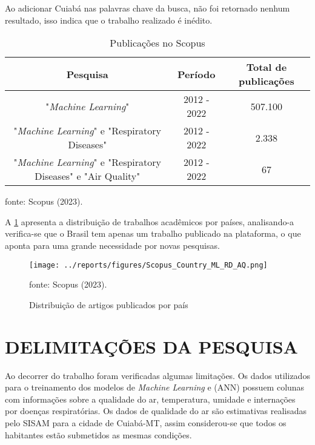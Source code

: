 \documentclass[
  12pt,		%
  a4paper,	%
  openright,%
  oneside,	%
  chapter=TITLE,		%
  section=TITLE,		%
  english,	%
  french,	%
  spanish,	%
  brazil	%
]{abntex2}
\begin{document}
    Ao adicionar Cuiabá nas palavras chave da busca, não foi retornado nenhum resultado, isso indica que o trabalho realizado é inédito.

    \begin{table}[ht]
        \centering
        \caption{Publicações no Scopus}
        \label{tabela scopus}
        \begin{tabular}{ccc}
            \hline
            \multicolumn{1}{|c|}{Pesquisa} & \multicolumn{1}{c|}{Período} & \multicolumn{1}{c|}{Total de publicações}\\
            \hline
            "\textit{Machine Learning}" & 2012 - 2022 & 507.100 \\
            "\textit{Machine Learning}" e "Respiratory Diseases" & 2012 - 2022 & 2.338 \\
            "\textit{Machine Learning}" e "Respiratory Diseases"  e "Air Quality" & 2012 - 2022 & 67 \\
            \hline
        \end{tabular}
        \par
        {\small fonte: Scopus (2023).}
    \end{table}

    A \ref*{scopus_country} apresenta a distribuição de trabalhos acadêmicos por países, analisando-a verifica-se que o Brasil tem apenas um trabalho publicado
    na plataforma, o que aponta para uma grande necessidade por novas pesquisas.

    \begin{figure}[ht]
        \centering
        \caption{Distribuição de artigos publicados por país}
        \texttt{[image: ../reports/figures/Scopus\_Country\_ML\_RD\_AQ.png]}
        \label{scopus_country}
        \par
        {\small fonte: Scopus (2023).}
    \end{figure}

    \section{DELIMITAÇÕES DA PESQUISA}
    Ao decorrer do trabalho foram verificadas algumas limitações.
    Os dados utilizados para o treinamento dos modelos de \textit{Machine Learning} e (ANN) possuem 
    colunas com informações sobre a qualidade do ar, temperatura, umidade e internações por doenças respiratórias. Os dados de qualidade
    do ar são estimativas realisadas pelo SISAM para a cidade de Cuiabá-MT, assim considerou-se que todos os habitantes 
    estão submetidos as mesmas condições.
\end{document}
